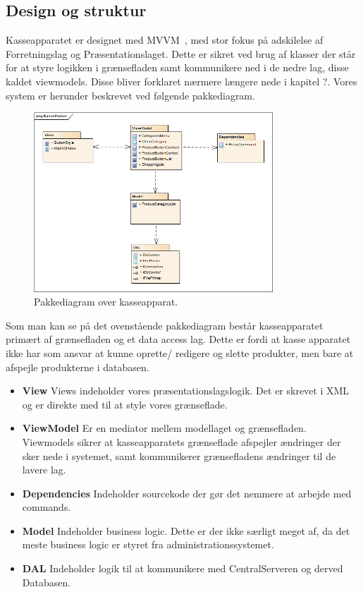 \subsection{Design og struktur}
Kasseapparatet er designet med MVVM~\cite{MVVM}, med stor fokus på adskilelse af Forretningslag og Præsentationslaget. Dette er sikret ved brug af klasser der står for at styre logikken i grænsefladen samt kommunikere ned i de nedre lag, disse kaldet viewmodels. Disse bliver forklaret nærmere længere nede i kapitel ?.
Vores system er herunder beskrevet ved følgende pakkediagram.	

\begin{figure}[H]
	\centering
	\includegraphics[width=0.8\textwidth]{Systemdesign/Frontend/pics/KassePakker}
	\caption{Pakkediagram over kasseapparat.}
	\label{fig:EndeligeGUI}
\end{figure}

Som man kan se på det ovenstående pakkediagram består kasseapparatet primært af grænsefladen og et data access lag. Dette er fordi at kasse apparatet ikke har som ansvar at kunne oprette/ redigere og slette produkter, men bare at afspejle produkterne i databasen. 

\begin{itemize}
	\item \textbf{View} Views indeholder vores præsentationslagslogik. Det er skrevet i XML og er direkte med til at style vores grænseflade.
	\item \textbf{ViewModel} Er en mediator mellem modellaget og grænsefladen. Viewmodels sikrer at kasseapparatets grænseflade afspejler ændringer der sker nede i systemet, samt kommunikerer grænsefladens ændringer til de lavere lag.
	\item \textbf{Dependencies} Indeholder sourcekode der gør det nemmere at arbejde med commands.
	\item \textbf{Model} Indeholder business logic. Dette er der ikke særligt meget af, da det meste business logic er styret fra administrationssystemet.
	\item \textbf{DAL} Indeholder logik til at kommunikere med CentralServeren og derved Databasen.
\end{itemize}


